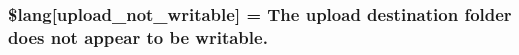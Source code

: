 \subsubsection[{\$lang}]{\setlength{\rightskip}{0pt plus 5cm}\$lang\mbox{[}\textquotesingle{}upload\+\_\+not\+\_\+writable\textquotesingle{}\mbox{]} = \textquotesingle{}The upload destination folder does not appear to be writable.\textquotesingle{}}\label{system_2language_2english_2upload__lang_8php_aed6bfb5a9094179427f61fcbb582145b}
